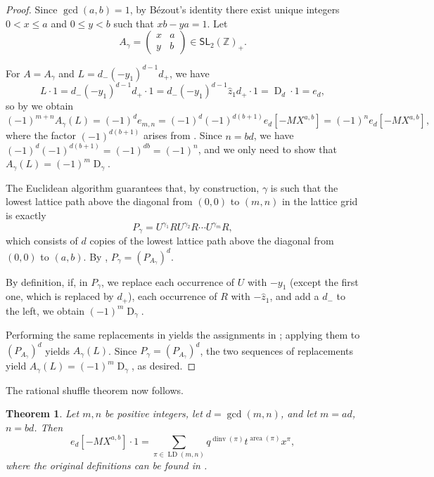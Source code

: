 \documentclass[reqno]{amsart}
\theoremstyle{plain}
\newtheorem{theorem}{Theorem}[section]
\theoremstyle{definition}
\theoremstyle{remark}
\DeclareMathOperator{\D}{D}
\DeclareMathOperator{\LD}{LD}
\DeclareMathOperator{\area}{area}
\DeclareMathOperator{\dinv}{dinv}
\newcommand{\z}{\widehat{z}}
\newcommand{\<}{\langle}
\renewcommand{\>}{\rangle}
\begin{document}
\begin{proof}
    Since $\gcd(a,b) = 1$, by Bézout's identity there exist unique integers $0 < x \leq a$ and $0 \leq y < b$ such that $xb - ya = 1$. Let
    \[ A_\gamma = \begin{pmatrix} x & a \\ y & b \end{pmatrix}  \in \mathsf{SL}_2(\mathbb{Z})_+. \]

    For $A = A_\gamma$ and $L = d_- (-y_1)^{d-1} d_+$, we have \[ L \cdot 1 = d_- (-y_1)^{d-1} d_+ \cdot 1 = d_- (-y_1)^{d-1} \z_1 d_+ \cdot 1 = \D_d \cdot 1 = e_d, \]
    so by  we obtain
    \[ (-1)^{m+n} A_\gamma(L) = (-1)^d e_{m,n} = (-1)^d (-1)^{d(b+1)} e_d \left[ -MX^{a,b} \right] = (-1)^{n} e_d \left[ -MX^{a,b} \right], \]
    where the factor $(-1)^{d(b+1)}$ arises from . Since $n = bd$, we have $(-1)^d (-1)^{d(b+1)} = (-1)^{db} = (-1)^n$, and we only need to show that $A_\gamma(L) = (-1)^m \D_\gamma$.
    
    The Euclidean algorithm guarantees that, by construction, $\gamma$ is such that the lowest lattice path above the diagonal from $(0,0)$ to $(m,n)$ in the lattice grid is exactly \[ P_\gamma = U^{\gamma_1} R U^{\gamma_2} R \cdots U^{\gamma_m} R, \]
    which consists of $d$ copies of the lowest lattice path above the diagonal from $(0,0)$ to $(a,b)$. By , $P_\gamma = (P_{A_\gamma})^d$.

    By definition, if, in $P_\gamma$, we replace each occurrence of $U$ with $-y_1$ (except the first one, which is replaced by $d_+$), each occurrence of $R$ with $-\z_1$, and add a $d_-$ to the left, we obtain $(-1)^m \D_\gamma$.

    Performing the same replacements in  yields the assignments in ; applying them to $(P_{A_\gamma})^d$ yields $A_\gamma(L)$. Since $P_\gamma = (P_{A_\gamma})^d$, the two sequences of replacements yield $A_\gamma(L) = (-1)^m \D_\gamma$, as desired.
\end{proof}

The rational shuffle theorem now follows.

\begin{theorem}
    Let $m, n$ be positive integers, let $d = \gcd(m,n)$, and let $m = ad$, $n = bd$. Then
    \[ e_d \left[ -MX^{a,b} \right] \cdot 1 = \sum_{\pi \in \LD(m,n)} q^{\dinv(\pi)} t^{\area(\pi)} x^\pi, \]
    where the original definitions can be found in \cite[Conjecture~4.2]{BergeronGarsiaSergelXin2015CompositionalShuffleConjectures}.
\end{theorem}
\end{document}
